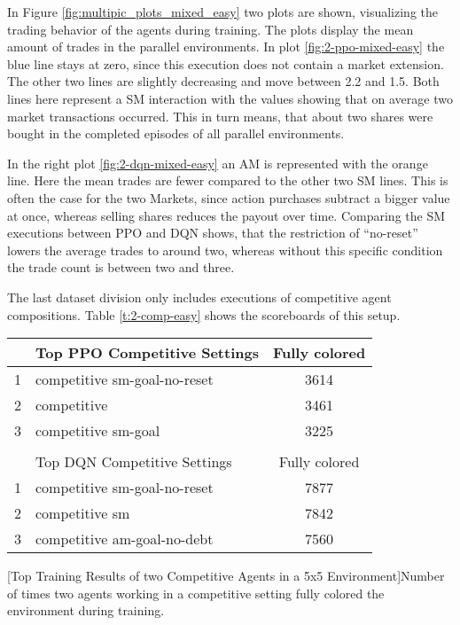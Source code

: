 In Figure \ref{fig:multipic_plots_mixed_easy} two plots are shown, visualizing the trading behavior of the agents during training. The plots display the mean amount of trades in the parallel environments. In plot \ref{fig:2-ppo-mixed-easy} the blue line stays at zero, since this execution does not contain a market extension. The other two lines are slightly decreasing and move between 2.2 and 1.5. Both lines here represent a SM interaction with the values showing that on average two market transactions occurred. This in turn means, that about two shares were bought in the completed episodes of all parallel environments.

In the right plot \ref{fig:2-dqn-mixed-easy} an AM is represented with the orange line. Here the mean trades are fewer compared to the other two SM lines. This is often the case for the two Markets, since action purchases subtract a bigger value at once, whereas selling shares reduces the payout over time. Comparing the SM executions between PPO and DQN shows, that the restriction of ``no-reset'' lowers the average trades to around two, whereas without this specific condition the trade count is between two and three.

The last dataset division only includes executions of competitive agent compositions. Table \ref{t:2-comp-easy} shows the scoreboards of this setup.

\begin{center}
    \begin{tabular}{clc}\hline
         & Top PPO Competitive Settings & Fully colored \\ \hline
        {\small 1} & competitive sm-goal-no-reset & 3614 \\
        {\small 2} & competitive & 3461 \\
        {\small 3} & competitive sm-goal & 3225 \\ \hline
         &   \\ \hline
         & Top DQN Competitive Settings & Fully colored \\ \hline
        {\small 1} & competitive sm-goal-no-reset & 7877 \\
        {\small 2} & competitive sm & 7842 \\
        {\small 3} & competitive am-goal-no-debt & 7560 \\ \hline
        \end{tabular}
        [Top Training Results of two Competitive Agents in a 5x5 Environment]{Number of times two agents working in a competitive setting fully colored the environment during training.}\label{t:2-comp-easy}
    \end{center}

